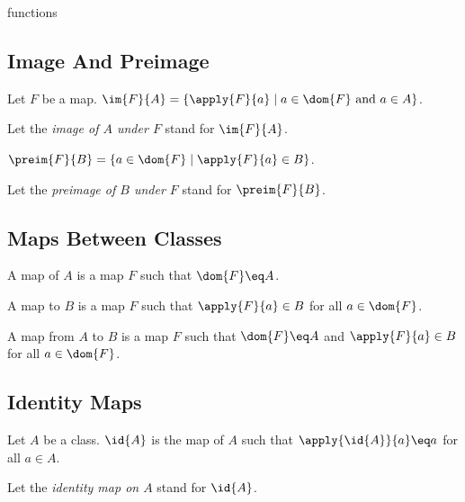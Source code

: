 \documentclass{naproche-library}
\begin{document}
\begin{smodule}{functions}
\subsection{Image And Preimage}

\begin{definition*}[forthel,id=ImageDef,printid]
  Let $F$ be a map.
  $\im{F}{A}=\{\apply{F}{a}\mid a\in\dom{F}\text{ and }a\in A\}$.

  Let the \emph{image of $A$ under $F$} stand for $\im{F}{A}$.
\end{definition*}

\begin{definition*}[forthel,id=PreimageDef,printid]
  $\preim{F}{B}=\{a\in\dom{F}\mid \apply{F}{a}\in B\}$.

  Let the \emph{preimage of $B$ under $F$} stand for $\preim{F}{B}$.
\end{definition*}


\subsection{Maps Between Classes}

\begin{definition*}[forthel,id=MapFromDef,printid]
  A map of $A$ is a map $F$ such that $\dom{F}\eq A$.
\end{definition*}

\begin{definition*}[forthel,id=MapToDef,printid]
  A map to $B$ is a map $F$ such that $\apply{F}{a}\in B$ for all $a\in\dom{F}$.
\end{definition*}

\begin{definition*}[forthel,id=MapFromToDef,printid]
  A map from $A$ to $B$ is a map $F$ such that $\dom{F}\eq A$ and $\apply{F}{a}\in B$ for all $a\in\dom{F}$.
\end{definition*}


\subsection{Identity Maps}

\begin{definition*}[forthel,id=IdentityMapDef,printid]
  Let $A$ be a class.
  $\id{A}$ is the map of $A$ such that $\apply{\id{A}}{a}\eq a$ for all $a\in A$.

  Let the \emph{identity map on $A$} stand for $\id{A}$.
\end{definition*}



\end{smodule}
\end{document}
